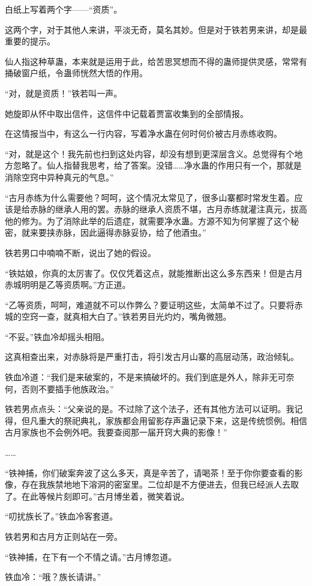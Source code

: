 \begin{this_body}
白纸上写着两个字——“资质”。

这两个字，对于其他人来讲，平淡无奇，莫名其妙。但是对于铁若男来讲，却是最重要的提示。

仙人指这种草蛊，本来就是运用于此，给苦思冥想而不得的蛊师提供灵感，常常有捅破窗户纸，令蛊师恍然大悟的作用。

“对，就是资质！”铁若叫一声。

她旋即从怀中取出信件，这信件中记载着贾富收集到的全部情报。

在这情报当中，有这么一行内容，写着净水蛊在何时何价被古月赤练收购。

“对，就是这个！我先前也扫到这处内容，却没有想到更深层含义。总觉得有个地方忽略了。仙人指替我思考，给了答案。没错……净水蛊的作用只有一个，那就是消除空窍中异种真元的气息。”

“古月赤练为什么需要他？呵呵，这个情况太常见了，很多山寨都时常发生着。应该是给赤脉的继承人用的罢。赤脉的继承人资质不堪，古月赤练就灌注真元，拔高他的修为。为了消除此举的后遗症，就需要净水蛊。方源不知为何掌握了这个秘密，就来要挟赤脉，因此逼得赤脉妥协，给了他酒虫。”

铁若男口中喃喃不断，说出了她的假设。

“铁姑娘，你真的太厉害了。仅仅凭着这点，就能推断出这么多东西来！但是古月赤城明明是乙等资质啊。”方正道。

“乙等资质，呵呵，难道就不可以作弊么？要证明这些，太简单不过了。只要将赤城的空窍一查，就真相大白了。”铁若男目光灼灼，嘴角微翘。

“不妥。”铁血冷却摇头相阻。

这真相查出来，对赤脉将是严重打击，将引发古月山寨的高层动荡，政治倾轧。

铁血冷道：“我们是来破案的，不是来搞破坏的。我们到底是外人，除非无可奈何，否则不要插手他族政治。”

铁若男点点头：“父亲说的是。不过除了这个法子，还有其他方法可以证明。我记得，但凡重大的祭祀典礼，家族都会用留影存声蛊记录下来，这是传统惯例。相信古月家族也不会例外吧。我要查阅那一届开窍大典的影像！”

……

“铁神捕，你们破案奔波了这么多天，真是辛苦了，请喝茶！至于你你要查看的影像，存在我族禁地地下溶洞的密室里。二位却是不方便进去，但我已经派人去取了。在此等候片刻即可。”古月博坐着，微笑着说。

“叨扰族长了。”铁血冷客套道。

铁若男和古月方正则站在一旁。

“铁神捕，在下有一个不情之请。”古月博忽道。

铁血冷：“哦？族长请讲。”


\end{this_body}
